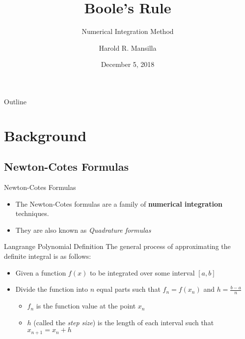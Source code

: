 \documentclass{beamer}
\title{Boole's Rule}
\subtitle{Numerical Integration Method}
\author{Harold R. Mansilla\inst{1}}
\institute[University of the Philippines Manila] %
{
  \inst{1}%
  Department of Physical Sciences and Mathematics\\
  University of the Philippines Manila
}
\date{December 5, 2018}
\begin{document}
\begin{frame}
  \titlepage
\end{frame}

\begin{frame}[allowframebreaks]{Outline}
  \tableofcontents
\end{frame}

\section{Background}

\subsection{Newton-Cotes Formulas}

\begin{frame}{Newton-Cotes Formulas}
  \begin{itemize}
    \item The \alert{Newton-Cotes formulas} are a family of \textbf{numerical integration} techniques. \pause 
    \item They are also known as \textit{Quadrature formulas}
  \end{itemize}
\end{frame}

\begin{frame}{Langrange Polynomial Definition}
  The general process of approximating the definite integral is as follows:
    \begin{itemize}
       \item Given a function $f(x)$ to be integrated over some interval $[a,b]$ \pause
       \item Divide the function into $n$ equal parts such that $f_n = f(x_n)$ and $h = \frac{b - a}{n}$
       \begin{itemize}
         \item $f_n$ is the function value at the point $x_n$
         \item $h$ (called the \textit{step size}) is the length of each interval such that $x_{n+1} = x_n + h$
       \end{itemize}
    \end{itemize}
\end{frame}
\end{document}
